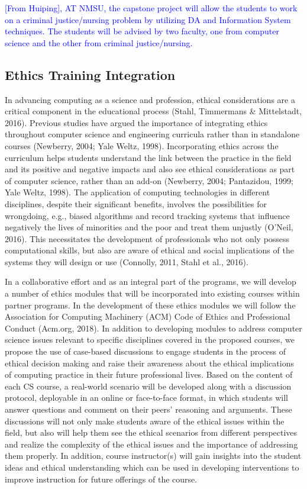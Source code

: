 \textcolor{blue}{[From Huiping], AT NMSU, the capstone project will allow the students to work on a criminal justice/nursing problem by utilizing DA and Information System techniques. The students will be advised by two faculty, one from computer science and the other from criminal justice/nursing.
}

\subsection{Ethics Training Integration}
In advancing computing as a science and profession, ethical considerations are a critical component in the educational process (Stahl, Timmermans \& Mittelstadt, 2016). Previous studies have argued the importance of integrating ethics throughout computer science and engineering curricula rather than in standalone courses (Newberry, 2004; Yale Weltz, 1998). Incorporating ethics across the curriculum helps students understand the link between the practice in the field and its positive and negative impacts and also see ethical considerations as part of computer science, rather than an add-on (Newberry, 2004; Pantazidou, 1999; Yale Weltz, 1998). The application of computing technologies in different disciplines, despite their significant benefits, involves the possibilities for wrongdoing, e.g., biased algorithms and record tracking systems that influence negatively the lives of minorities and the poor and treat them unjustly (O’Neil, 2016). This necessitates the development of professionals who not only possess computational skills, but also are aware of ethical and social implications of the systems they will design or use (Connolly, 2011, Stahl et al., 2016).

In a collaborative effort and as an integral part of the programs, we will develop a number of ethics modules that will be incorporated into existing courses within partner programs. In the development of these ethics modules we will follow the Association for Computing Machinery (ACM) Code of Ethics and Professional Conduct (Acm.org, 2018). In addition to developing modules to address computer science issues relevant to specific disciplines covered in the proposed courses, we propose the use of case-based discussions to engage students in the process of ethical decision making and raise their awareness about the ethical implications of computing practice in their future professional lives. Based on the content of each CS course, a real-world scenario will be developed along with a discussion protocol, deployable in an online or face-to-face format, in which students will answer questions and comment on their peers’ reasoning and arguments. These discussions will not only make students aware of the ethical issues within the field, but also will help them see the ethical scenarios from different perspectives and  realize the complexity of the ethical issues and the importance of addressing them properly. In addition, course instructor(s) will gain insights into the student ideas and ethical understanding which can be used in developing interventions to improve instruction for future offerings of the course.

